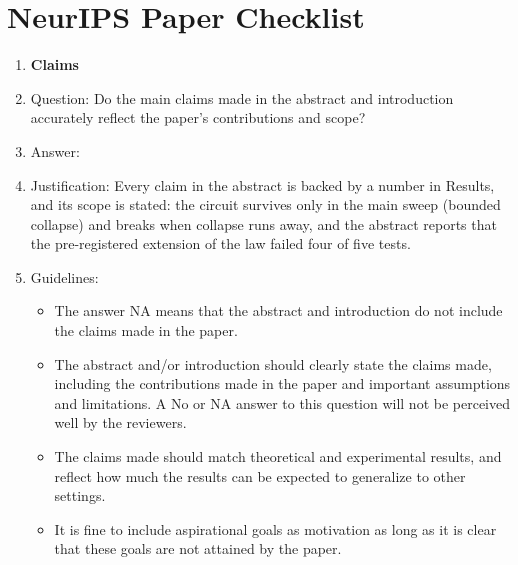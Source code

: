 \section*{NeurIPS Paper Checklist}

\begin{enumerate}

\item {\bf Claims}
    \item[] Question: Do the main claims made in the abstract and introduction accurately reflect the paper's contributions and scope?
    \item[] Answer: \answerYes{}
    \item[] Justification: Every claim in the abstract is backed by a number in Results, and its scope is stated: the circuit survives only in the main sweep (bounded collapse) and breaks when collapse runs away, and the abstract reports that the pre-registered extension of the law failed four of five tests.
    \item[] Guidelines:
    \begin{itemize}
        \item The answer NA means that the abstract and introduction do not include the claims made in the paper.
        \item The abstract and/or introduction should clearly state the claims made, including the contributions made in the paper and important assumptions and limitations. A No or NA answer to this question will not be perceived well by the reviewers.
        \item The claims made should match theoretical and experimental results, and reflect how much the results can be expected to generalize to other settings.
        \item It is fine to include aspirational goals as motivation as long as it is clear that these goals are not attained by the paper.
    \end{itemize}


\end{enumerate}
